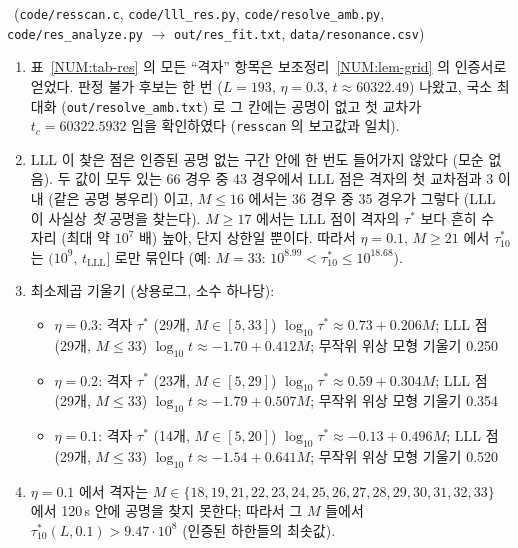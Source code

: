 \begin{proposition}[공명 높이 자료]\label{NUM:prop-res}
\NUMERIC\ (\texttt{code/resscan.c}, \texttt{code/lll\_res.py}, \texttt{code/resolve\_amb.py}, \texttt{code/res\_analyze.py} $\to$ \texttt{out/res\_fit.txt}, \texttt{data/resonance.csv})
\begin{enumerate}[label=(\arabic*)]
\item 표~\ref{NUM:tab-res} 의 모든 ``격자'' 항목은 보조정리~\ref{NUM:lem-grid} 의 인증서로 얻었다. 판정 불가 후보는 한 번 ($L=193$, $\eta=0.3$, $t\approx60322.49$) 나왔고,
국소 최대화 (\texttt{out/resolve\_amb.txt}) 로 그 칸에는 공명이 없고 첫 교차가 $t_c=60322.5932$ 임을 확인하였다 (\texttt{resscan} 의 보고값과 일치).
\item LLL 이 찾은 점은 인증된 공명 없는 구간 안에 한 번도 들어가지 않았다 (모순 없음). 두 값이 모두 있는 66 경우 중 43 경우에서
LLL 점은 격자의 첫 교차점과 $3$ 이내 (같은 공명 봉우리) 이고, $M\le16$ 에서는 36 경우 중 35 경우가 그렇다 (LLL 이 사실상 \emph{첫} 공명을 찾는다).
$M\ge17$ 에서는 LLL 점이 격자의 $\tau^*$ 보다 흔히 수 자리 (최대 약 $10^{7}$ 배) 높아, 단지 상한일 뿐이다. 따라서 $\eta=0.1$, $M\ge21$ 에서
$\tau^*_{10}$ 는 $(10^{9},\,t_{\mathrm{LLL}}]$ 로만 묶인다 (예: $M=33$: $10^{8.99}<\tau^*_{10}\le10^{18.68}$).
\item 최소제곱 기울기 (상용로그, 소수 하나당):
\begin{itemize}
\item $\eta=0.3$: 격자 $\tau^*$ (29개, $M\in[5,33]$) $\log_{10}\tau^*\approx0.73+0.206M$; LLL 점 (29개, $M\le33$) $\log_{10}t\approx-1.70+0.412M$; 무작위 위상 모형 기울기 0.250
\item $\eta=0.2$: 격자 $\tau^*$ (23개, $M\in[5,29]$) $\log_{10}\tau^*\approx0.59+0.304M$; LLL 점 (29개, $M\le33$) $\log_{10}t\approx-1.79+0.507M$; 무작위 위상 모형 기울기 0.354
\item $\eta=0.1$: 격자 $\tau^*$ (14개, $M\in[5,20]$) $\log_{10}\tau^*\approx-0.13+0.496M$; LLL 점 (29개, $M\le33$) $\log_{10}t\approx-1.54+0.641M$; 무작위 위상 모형 기울기 0.520
\end{itemize}
\item $\eta=0.1$ 에서 격자는 $M\in\{18,19,21,22,23,24,25,26,27,28,29,30,31,32,33\}$ 에서 120\,s 안에 공명을 찾지 못한다; 따라서 그 $M$ 들에서 $\tau^*_{10}(L,0.1)>9.47\cdot10^{8}$ (인증된 하한들의 최솟값).
\end{enumerate}
\end{proposition}

